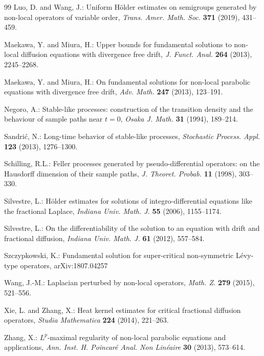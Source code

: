 \documentclass[a4paper,11pt]{amsart}
\theoremstyle{definition}
\begin{document}
\begin{thebibliography}{99}
 Luo, D. and Wang, J.: Uniform H\"older estimates on semigroups generated by non-local operators of variable order, \emph{Trans. Amer. Math. Soc.} {\bf 371} (2019), 431--459.


 Maekawa, Y. and Miura, H.:
Upper bounds for fundamental solutions to non-local diffusion
equations with divergence free drift, \emph{J. Funct. Anal.} \textbf{264} (2013), 2245--2268.

 Maekawa, Y. and Miura, H.:
On fundamental solutions for non-local parabolic equations with divergence free drift,
\emph{Adv. Math.} \textbf{247} (2013), 123--191.

Negoro, A.: Stable-like processes: construction of the transition density and the behaviour of
sample paths near $t=0$, \emph{Osaka J. Math.} \textbf{31} (1994), 189--214.









 Sandri\'{c}, N.: Long-time behavior of stable-like processes,
\emph{Stochastic Process. Appl.} \textbf{123} (2013), 1276--1300.

 Schilling, R.L.: Feller processes generated by pseudo-differential operators: on the Hausdorff dimension of their sample paths,
\emph{J. Theoret. Probab.} \textbf{11} (1998), 303--330.

 Silvestre, L.: H\"older estimates for solutions of integro-differential equations like the fractional Laplace,
\emph{Indiana Univ. Math. J.} \textbf{55} (2006), 1155--1174.

 Silvestre, L.: On the differentiability of the solution to an equation with drift and fractional diffusion,
\emph{Indiana Univ. Math. J.} \textbf{61} (2012), 557--584.

Szczypkowski, K.: Fundamental solution for super-critical non-symmetric L\'evy-type operators, arXiv:1807.04257

  Wang, J.-M.:
Laplacian perturbed by non-local operators,
\emph{Math. Z.}  \textbf{279} (2015), 521--556.


 Xie, L. and Zhang, X.: Heat kernel estimates
for critical fractional diffusion operators, \emph{Studia Mathematica} \textbf{224} (2014), 221--263.


 Zhang, X.: $L^p$-maximal regularity of non-local parabolic equations and applications, \emph{Ann. Inst. H. Poincar\'{e} Anal. Non Lin\'{e}aire}
\textbf{30} (2013), 573--614.

\end{thebibliography}
\end{document}
